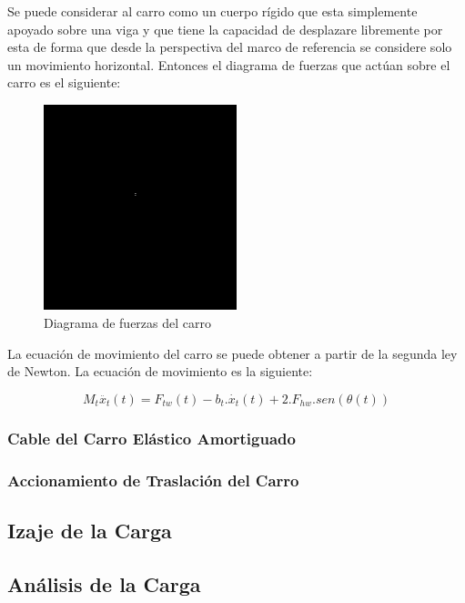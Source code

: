 Se puede considerar al carro como un cuerpo rígido que esta simplemente
apoyado sobre una viga y que tiene la capacidad de desplazare libremente
por esta de forma que desde la perspectiva del marco de referencia se
considere solo un movimiento horizontal. Entonces
el diagrama de fuerzas que actúan sobre el carro es el siguiente:

\begin{figure}[H]
    \centering
    \includegraphics[width=0.5\textwidth]{img/NADA.png}
    \caption{Diagrama de fuerzas del carro}
\end{figure}

La ecuación de movimiento del carro se puede obtener a partir de la segunda
ley de Newton. La ecuación de movimiento es la siguiente:

\begin{equation}
    M_t \ddot{x_t}(t)  = F_{tw}(t) - b_{t} . \dot{x_t}(t) + 2.F_{hw}.sen(\theta(t))
\end{equation}

\subsubsection{Cable del Carro Elástico Amortiguado}

\subsubsection{Accionamiento de Traslación del Carro}


\subsection{Izaje de la Carga}

\subsection{Análisis de la Carga}